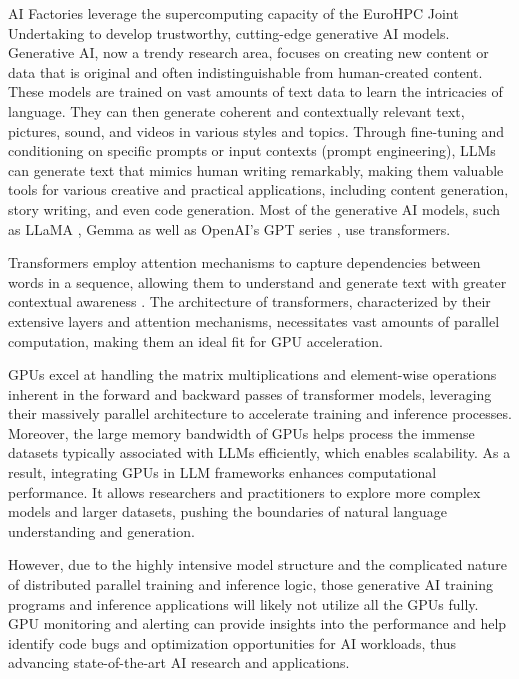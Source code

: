 AI Factories leverage the supercomputing capacity of the EuroHPC Joint Undertaking to develop trustworthy, cutting-edge generative AI models. Generative AI, now a trendy research area, focuses on creating new content or data that is original and often indistinguishable from human-created content. These models are trained on vast amounts of text data to learn the intricacies of language. They can then generate coherent and contextually relevant text, pictures, sound, and videos in various styles and topics. Through fine-tuning and conditioning on specific prompts or input contexts (prompt engineering), LLMs can generate text that mimics human writing remarkably, making them valuable tools for various creative and practical applications, including content generation, story writing, and even code generation. Most of the generative AI models, such as LLaMA \cite{touvron2023llama}, Gemma \cite{gemmateam2024gemma} as well as OpenAI's GPT series \cite{openai2024gpt4}, use transformers. 


Transformers employ attention mechanisms to capture dependencies between words in a sequence, allowing them to understand and generate text with greater contextual awareness \cite{NIPS2017_3f5ee243}. The architecture of transformers, characterized by their extensive layers and attention mechanisms, necessitates vast amounts of parallel computation, making them an ideal fit for GPU acceleration.

GPUs excel at handling the matrix multiplications and element-wise operations inherent in the forward and backward passes of transformer models, leveraging their massively parallel architecture to accelerate training and inference processes. Moreover, the large memory bandwidth of GPUs helps process the immense datasets typically associated with LLMs efficiently, which enables scalability. As a result, integrating GPUs in LLM frameworks enhances computational performance. It allows researchers and practitioners to explore more complex models and larger datasets, pushing the boundaries of natural language understanding and generation. 

However, due to the highly intensive model structure and the complicated nature of distributed parallel training and inference logic, those generative AI training programs and inference applications will likely not utilize all the GPUs fully. GPU monitoring and alerting can provide insights into the performance and help identify code bugs and optimization opportunities for AI workloads, thus advancing state-of-the-art AI research and applications.

